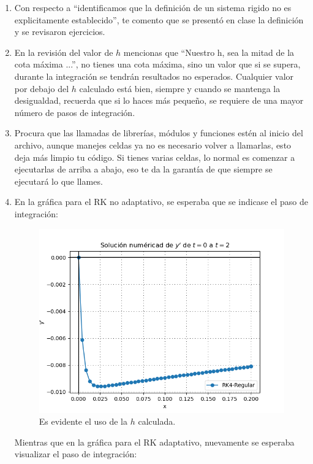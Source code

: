 \begin{enumerate}
\item Con respecto a \enquote{identificamos que la definición de un sistema rigido no es explicitamente  establecido}, te comento que se presentó en clase la definición y se revisaron ejercicios.
\item En la revisión del valor de $h$ mencionas que \enquote{Nuestro h, sea la mitad de la cota máxima ...}, no tienes una cota máxima, sino un valor que si se supera, durante la integración se tendrán resultados no esperados. Cualquier valor por debajo del $h$ calculado está bien, siempre y cuando se mantenga la desigualdad, recuerda que si lo haces más pequeño, se requiere de una mayor número de pasos de integración.
\item Procura que las llamadas de librerías, módulos y funciones estén al inicio del archivo, aunque manejes celdas ya no es necesario volver a llamarlas, esto deja más limpio tu código. Si tienes varias celdas, lo normal es comenzar a ejecutarlas de arriba a abajo, eso te da la garantía de que siempre se ejecutará lo que llames.
\item En la gráfica para el RK no adaptativo, se esperaba que se indicase el paso de integración:
\begin{figure}[H]
    \centering
    \includegraphics[scale=0.8]{Evidencia_02_04_01_Antonio.png}
    \caption{Es evidente el uso de la $h$ calculada.}
\end{figure}
Mientras que en la gráfica para el RK adaptativo, nuevamente se esperaba visualizar el paso de integración:
\begin{figure}[H]

\end{figure}
\end{enumerate}

